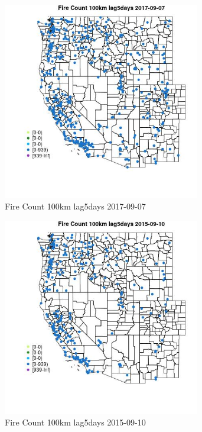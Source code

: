 \begin{figure} 
\centering  
\includegraphics[width=0.77\textwidth]{Code_Outputs/Report_ML_input_PM25_Step4_part_e_de_duplicated_aves_compiled_2019-05-21wNAs_MapObsFire_Count_100km_lag5days2017-09-07.jpg} 
\caption{\label{fig:Report_ML_input_PM25_Step4_part_e_de_duplicated_aves_compiled_2019-05-21wNAsMapObsFire_Count_100km_lag5days2017-09-07}Fire Count 100km lag5days 2017-09-07} 
\end{figure} 
 

\clearpage 

\begin{figure} 
\centering  
\includegraphics[width=0.77\textwidth]{Code_Outputs/Report_ML_input_PM25_Step4_part_e_de_duplicated_aves_compiled_2019-05-21wNAs_MapObsFire_Count_100km_lag5days2015-09-10.jpg} 
\caption{\label{fig:Report_ML_input_PM25_Step4_part_e_de_duplicated_aves_compiled_2019-05-21wNAsMapObsFire_Count_100km_lag5days2015-09-10}Fire Count 100km lag5days 2015-09-10} 
\end{figure} 
 

